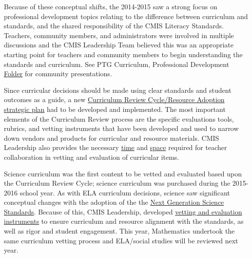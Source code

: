 \documentclass{report}
\begin{document}
\begin{findings}
Because of these conceptual shifts, the 2014-2015 saw a strong focus on professional development topics relating to the difference between curriculum and standards, and the shared responsibility of the CMIS Literacy Standards. Teachers, community members, and administrators were involved in multiple discussions and the CMIS Leadership Team believed this was an appropriate starting point for teachers and community members to begin understanding the standards and curriculum. See PTG Curriculum, Professional Development \href{https://drive.google.com/a/cmis.ac.th/folderview?id=0ByVFfrm0zfolWE0yenprdktGVlk&usp=sharing}{Folder} for community presentations. 

\href{https://docs.google.com/a/cmis.ac.th/document/d/1hh1nLUlJgg1hd7s6aG3u3We0L6o7Wg_ECdjc2f6DcT8/edit?usp=sharing}{}

Since curricular decisions should be made using clear standards and student outcomes as a guide, a new \href{https://docs.google.com/presentation/d/15ZhVBwOO3psFCM44ybsXFUNqrhpHmVHdekAzIXjRJ5U/edit?usp=sharing}{Curriculum Review Cycle/Resource Adoption strategic plan} had to be developed and implemented. The most important elements of the Curriculum Review process are the specific evaluations tools, rubrics, and vetting instruments that have been developed and used to narrow down vendors and products for curricular and resource materials. CMIS Leadership also provides the necessary \href{https://drive.google.com/file/d/0B4n_WCeTYd4_U2J0YnRWYVp4bk0/view?usp=sharing}{time} and \href{https://drive.google.com/file/d/0B4n_WCeTYd4_NjBfVm92blF6T00/view?usp=sharing}{space} required for teacher collaboration in vetting and evaluation of curricular items. 

Science curriculum was the first content to be vetted and evaluated based upon the Curriculum Review Cycle; science curriculum was purchased during the 2015-2016 school year. As with ELA curriculum decisions, science saw significant conceptual changes with the adoption of the the \href{https://drive.google.com/a/cmis.ac.th/file/d/0B71_pYxcTLo-eUtQZE9DLTFvYUE/view?usp=sharing}{Next Generation Science Standards}. Because of this, CMIS Leadership, developed \href{https://docs.google.com/a/cmis.ac.th/document/d/1u0crwv2uVJdfamGYP9NYsUvub7bkPO64dIu0uAAkSIo/edit?usp=sharing}{vetting and evaluation instruments} to ensure curriculum and resource alignment with the standards, as well as rigor and student engagement. This year, Mathematics undertook the same curriculum vetting process and ELA/social studies will be reviewed next year. 


\end{findings}
\end{document}
